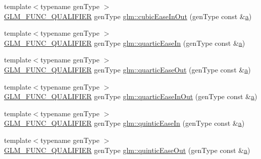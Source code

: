 \begin{DoxyCompactItemize}
\item 
{\footnotesize template$<$typename gen\+Type $>$ }\\\hyperlink{setup_8hpp_a33fdea6f91c5f834105f7415e2a64407}{G\+L\+M\+\_\+\+F\+U\+N\+C\+\_\+\+Q\+U\+A\+L\+I\+F\+I\+ER} gen\+Type \hyperlink{group__gtx__easing_ga55134072b42d75452189321d4a2ad91c}{glm\+::cubic\+Ease\+In\+Out} (gen\+Type const \&\hyperlink{_s_d_l__opengl__glext_8h_a3309789fc188587d666cda5ece79cf82}{a})
\item 
{\footnotesize template$<$typename gen\+Type $>$ }\\\hyperlink{setup_8hpp_a33fdea6f91c5f834105f7415e2a64407}{G\+L\+M\+\_\+\+F\+U\+N\+C\+\_\+\+Q\+U\+A\+L\+I\+F\+I\+ER} gen\+Type \hyperlink{group__gtx__easing_ga808b41f14514f47dad5dcc69eb924afd}{glm\+::quartic\+Ease\+In} (gen\+Type const \&\hyperlink{_s_d_l__opengl__glext_8h_a3309789fc188587d666cda5ece79cf82}{a})
\item 
{\footnotesize template$<$typename gen\+Type $>$ }\\\hyperlink{setup_8hpp_a33fdea6f91c5f834105f7415e2a64407}{G\+L\+M\+\_\+\+F\+U\+N\+C\+\_\+\+Q\+U\+A\+L\+I\+F\+I\+ER} gen\+Type \hyperlink{group__gtx__easing_ga4dfb33fa7664aa888eb647999d329b98}{glm\+::quartic\+Ease\+Out} (gen\+Type const \&\hyperlink{_s_d_l__opengl__glext_8h_a3309789fc188587d666cda5ece79cf82}{a})
\item 
{\footnotesize template$<$typename gen\+Type $>$ }\\\hyperlink{setup_8hpp_a33fdea6f91c5f834105f7415e2a64407}{G\+L\+M\+\_\+\+F\+U\+N\+C\+\_\+\+Q\+U\+A\+L\+I\+F\+I\+ER} gen\+Type \hyperlink{group__gtx__easing_ga6d000f852de12b197e154f234b20c505}{glm\+::quartic\+Ease\+In\+Out} (gen\+Type const \&\hyperlink{_s_d_l__opengl__glext_8h_a3309789fc188587d666cda5ece79cf82}{a})
\item 
{\footnotesize template$<$typename gen\+Type $>$ }\\\hyperlink{setup_8hpp_a33fdea6f91c5f834105f7415e2a64407}{G\+L\+M\+\_\+\+F\+U\+N\+C\+\_\+\+Q\+U\+A\+L\+I\+F\+I\+ER} gen\+Type \hyperlink{group__gtx__easing_ga097579d8e087dcf48037588140a21640}{glm\+::quintic\+Ease\+In} (gen\+Type const \&\hyperlink{_s_d_l__opengl__glext_8h_a3309789fc188587d666cda5ece79cf82}{a})
\item 
{\footnotesize template$<$typename gen\+Type $>$ }\\\hyperlink{setup_8hpp_a33fdea6f91c5f834105f7415e2a64407}{G\+L\+M\+\_\+\+F\+U\+N\+C\+\_\+\+Q\+U\+A\+L\+I\+F\+I\+ER} gen\+Type \hyperlink{group__gtx__easing_ga7dbd4d5c8da3f5353121f615e7b591d7}{glm\+::quintic\+Ease\+Out} (gen\+Type const \&\hyperlink{_s_d_l__opengl__glext_8h_a3309789fc188587d666cda5ece79cf82}{a})

\end{DoxyCompactItemize}
